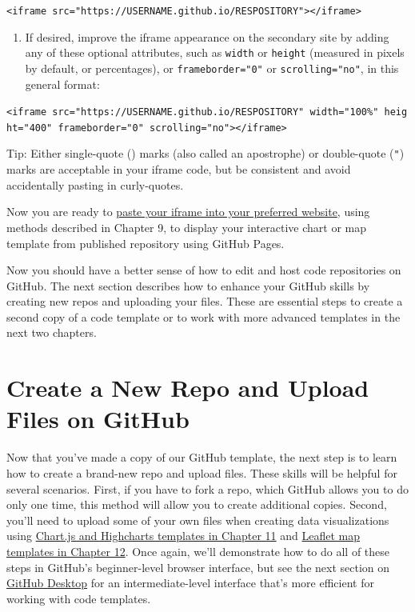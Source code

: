 \documentclass[
  english,
]{book}
\providecommand{\tightlist}{%
  \setlength{\itemsep}{0pt}\setlength{\parskip}{0pt}}
\begin{document}
\texttt{\textless{}iframe\ src="https://USERNAME.github.io/RESPOSITORY"\textgreater{}\textless{}/iframe\textgreater{}}

\begin{enumerate}
\def\labelenumi{\arabic{enumi}.}
\setcounter{enumi}{2}
\tightlist
\item
  If desired, improve the iframe appearance on the secondary site by adding any of these optional attributes, such as \texttt{width} or \texttt{height} (measured in pixels by default, or percentages), or \texttt{frameborder="0"} or \texttt{scrolling="no"}, in this general format:
\end{enumerate}

\texttt{\textless{}iframe\ src="https://USERNAME.github.io/RESPOSITORY"\ width="100\%"\ height="400"\ frameborder="0"\ scrolling="no"\textgreater{}\textless{}/iframe\textgreater{}}

Tip: Either single-quote (\texttt{\textquotesingle{}}) marks (also called an apostrophe) or double-quote (\texttt{"}) marks are acceptable in your iframe code, but be consistent and avoid accidentally pasting in curly-quotes.

Now you are ready to \href{paste-code.html}{paste your iframe into your preferred website}, using methods described in Chapter 9, to display your interactive chart or map template from published repository using GitHub Pages.

Now you should have a better sense of how to edit and host code repositories on GitHub. The next section describes how to enhance your GitHub skills by creating new repos and uploading your files. These are essential steps to create a second copy of a code template or to work with more advanced templates in the next two chapters.

\hypertarget{create-repo}{%
\section*{Create a New Repo and Upload Files on GitHub}\label{create-repo}}

Now that you've made a copy of our GitHub template, the next step is to learn how to create a brand-new repo and upload files. These skills will be helpful for several scenarios. First, if you have to fork a repo, which GitHub allows you to do only one time, this method will allow you to create additional copies. Second, you'll need to upload some of your own files when creating data visualizations using \href{chartcode.html}{Chart.js and Highcharts templates in Chapter 11} and \href{leaflet.html}{Leaflet map templates in Chapter 12}. Once again, we'll demonstrate how to do all of these steps in GitHub's beginner-level browser interface, but see the next section on \href{github-desktop-atom.html}{GitHub Desktop} for an intermediate-level interface that's more efficient for working with code templates.
\end{document}
